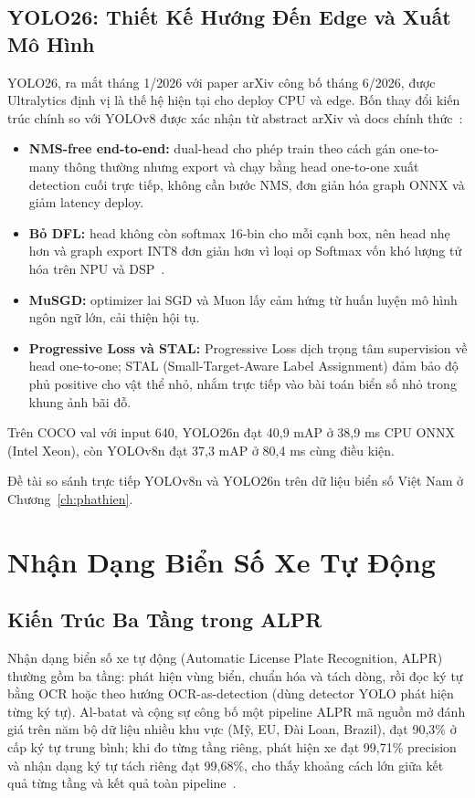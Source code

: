 \subsection{YOLO26: Thiết Kế Hướng Đến Edge và Xuất Mô Hình}
\label{sec:yolo26}

YOLO26, ra mắt tháng 1/2026 với paper arXiv công bố tháng 6/2026, được Ultralytics định
vị là thế hệ hiện tại cho deploy CPU và edge. Bốn thay đổi kiến trúc chính so với YOLOv8
được xác nhận từ abstract arXiv và docs chính
thức~\autocite{jocher2026yolo26,chakrabarty2026yolo26nmsfree}:

\begin{itemize}
  \item \textbf{NMS-free end-to-end:} dual-head cho phép train theo cách gán one-to-many thông thường nhưng export và chạy bằng head one-to-one xuất detection cuối trực tiếp, không cần bước NMS, đơn giản hóa graph ONNX và giảm latency deploy.
  \item \textbf{Bỏ DFL:} head không còn softmax 16-bin cho mỗi cạnh box, nên head nhẹ hơn và graph export INT8 đơn giản hơn vì loại op Softmax vốn khó lượng tử hóa trên NPU và DSP~\autocite{chakrabarty2026yolo26nmsfree}.
  \item \textbf{MuSGD:} optimizer lai SGD và Muon lấy cảm hứng từ huấn luyện mô hình ngôn ngữ lớn, cải thiện hội tụ.
  \item \textbf{Progressive Loss và STAL:} Progressive Loss dịch trọng tâm supervision về head one-to-one; STAL (Small-Target-Aware Label Assignment) đảm bảo độ phủ positive cho vật thể nhỏ, nhắm trực tiếp vào bài toán biển số nhỏ trong khung ảnh bãi đỗ.
\end{itemize}

Trên COCO val với input 640, YOLO26n đạt 40,9 mAP ở 38,9 ms CPU ONNX (Intel Xeon), còn
YOLOv8n đạt 37,3 mAP ở 80,4 ms cùng điều kiện.

Đề tài so sánh trực tiếp YOLOv8n và YOLO26n trên dữ liệu biển số Việt Nam ở
Chương~\ref{ch:phathien}.

\section{Nhận Dạng Biển Số Xe Tự Động}

\subsection{Kiến Trúc Ba Tầng trong ALPR}

Nhận dạng biển số xe tự động (Automatic License Plate Recognition, ALPR) thường gồm ba
tầng: phát hiện vùng biển, chuẩn hóa và tách dòng, rồi đọc ký tự bằng OCR hoặc theo hướng
OCR-as-detection (dùng detector YOLO phát hiện từng ký tự). Al-batat và cộng sự công bố
một pipeline ALPR mã nguồn mở đánh giá trên năm bộ dữ liệu nhiều khu vực (Mỹ, EU, Đài
Loan, Brazil), đạt 90,3\% ở cấp ký tự trung bình; khi đo từng tầng riêng, phát hiện xe
đạt 99,71\% precision và nhận dạng ký tự tách riêng đạt 99,68\%, cho thấy khoảng cách lớn
giữa kết quả từng tầng và kết quả toàn
pipeline~\autocite{albatat2022endtoend,redalb2022alprcode}.

